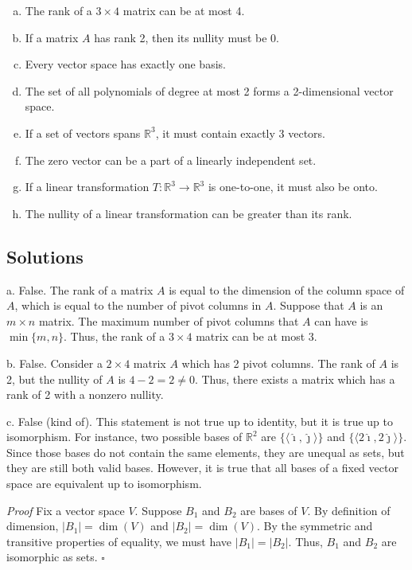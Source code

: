 \documentclass{zupan}
\begin{document}
\begin{enumerate}[a.]
  \item The rank of a \(3 \times 4\) matrix can be at most 4.
  \item If a matrix \(A\) has rank 2, then its nullity must be 0.
  \item Every vector space has exactly one basis.
  \item The set of all polynomials of degree at most 2 forms a 2-dimensional
    vector space.
  \item If a set of vectors spans \(\mathbb{R}^3\), it must contain exactly 3
    vectors.
  \item The zero vector can be a part of a linearly independent set.
  \item If a linear transformation \(T : \mathbb{R}^3 \to \mathbb{R}^3\) is
    one-to-one, it must also be onto.
  \item The nullity of a linear transformation can be greater than its rank.
\end{enumerate}

\subsection*{Solutions}

a. False. The rank of a matrix \(A\) is equal to the dimension of the column
space of \(A\), which is equal to the number of pivot columns in \(A\). Suppose
that \(A\) is an \(m \times n\) matrix. The maximum number of pivot columns
that \(A\) can have is \(\min\{m, n\}\). Thus, the rank of a \(3 \times 4\)
matrix can be at most 3.

b. False. Consider a \(2 \times 4\) matrix \(A\) which has 2 pivot columns. The
rank of \(A\) is 2, but the nullity of \(A\) is \(4 - 2 = 2 \neq 0\). Thus,
there exists a matrix which has a rank of 2 with a nonzero nullity.

c. False (kind of). This statement is not true up to identity, but it is true
up to isomorphism. For instance, two possible bases of \(\mathbb{R}^2\) are
\(\{\langle \hat\imath, \hat\jmath \rangle\}\) and \(\{\langle 2\hat\imath,
2\hat\jmath \rangle\}\). Since those bases do not contain the same elements,
they are unequal as sets, but they are still both valid bases. However, it is
true that all bases of a fixed vector space are equivalent up to isomorphism.

\textit{Proof} \: Fix a vector space \(V\). Suppose \(B_1\) and \(B_2\) are
bases of \(V\). By definition of dimension, \(|B_1| = \dim(V)\) and \(|B_2| =
\dim(V)\). By the symmetric and transitive properties of equality, we must have
\(|B_1| = |B_2|\). Thus, \(B_1\) and \(B_2\) are isomorphic as sets.
\(\square\)
\end{document}
